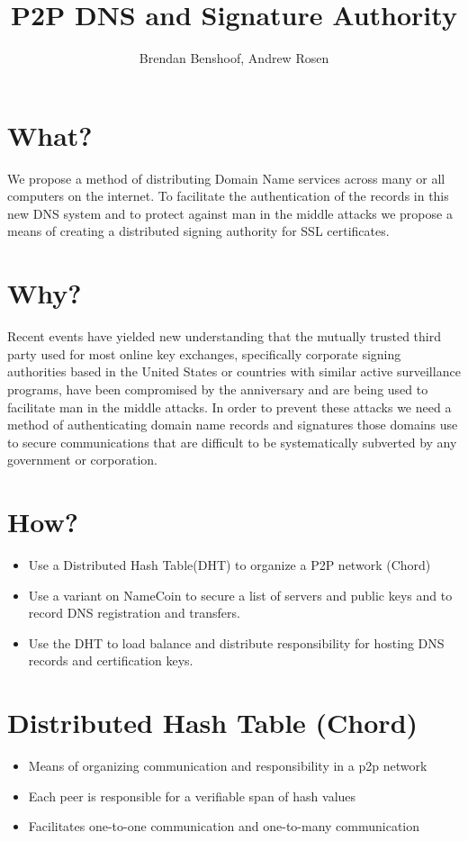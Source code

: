 \documentclass{IEEEtran}
\title{P2P DNS and Signature Authority}
\author{Brendan Benshoof, Andrew Rosen}
\begin{document}
\maketitle

\section{What?}
We propose a method of distributing Domain Name services across many or all computers on the internet. To facilitate the authentication of the records in this new DNS system and to protect against man in the middle attacks we propose a means of creating a distributed signing authority for SSL certificates.

\section{Why?}
Recent events have yielded new understanding that the mutually trusted third party used for most online key exchanges, specifically corporate signing authorities based in the United States or countries with similar active surveillance programs, have been compromised by the anniversary and are being used to facilitate man in the middle attacks. In order to prevent these attacks we need a method of authenticating domain name records and signatures those domains use to secure communications that are difficult to be systematically subverted by any government or corporation.

\section{How?}
\begin{itemize}
\item{Use a Distributed Hash Table(DHT) to organize a P2P network (Chord)}
\item{Use a variant on NameCoin to secure a list of servers and public keys and to record DNS registration and transfers.}
\item{Use the DHT to load balance and distribute responsibility for hosting DNS records and certification keys.}
\end{itemize}

\section{Distributed Hash Table (Chord)}
\begin{itemize}
\item{Means of organizing communication and responsibility in a p2p network}
\item{Each peer is responsible for a verifiable span of hash values}
\item{Facilitates one-to-one communication and one-to-many communication}
\end{itemize}
\end{document}
